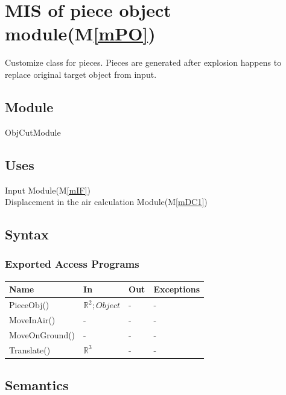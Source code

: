 \documentclass[12pt, titlepage]{article}
\newcommand{\mref}[1]{M\ref{#1}}
\begin{document}
\section{MIS of piece object module(\mref{mPO})}

Customize class for pieces. Pieces are generated after explosion happens to replace original target object from input.

\subsection{Module}

ObjCutModule

\subsection{Uses}

Input Module(\mref{mIF})\\
Displacement in the air calculation Module(\mref{mDC1})\\ 

\subsection{Syntax}

\subsubsection{Exported Access Programs}

\begin{center}
	\begin{tabular}{p{4cm} p{4cm} p{4cm} p{2cm}}
		\hline
		\textbf{Name} & \textbf{In} & \textbf{Out} & \textbf{Exceptions} \\
		\hline		
		PieceObj() & $\mathbb{R}^{2};Object$ & - & - \\
		MoveInAir() & - & - & - \\
		MoveOnGround() & - & - & - \\
		Translate() & $\mathbb{R}^{3}$ & - & - \\
		\hline
	\end{tabular}
\end{center}


\subsection{Semantics}
\end{document}
